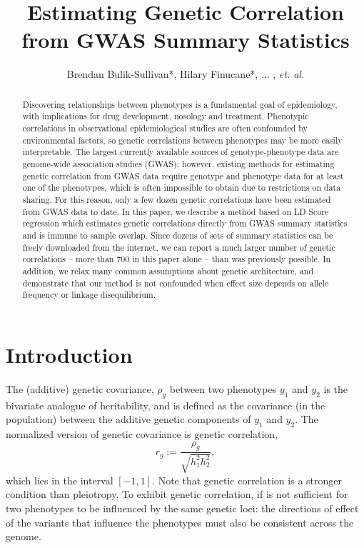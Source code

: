 \documentclass[11pt]{article}
\title{Estimating Genetic Correlation from GWAS Summary Statistics}
\author{Brendan Bulik-Sullivan*, Hilary Finucane*, ... , \emph{et. al.}}
\numberwithin{equation}{section}
\begin{document}
\maketitle
\newpage
\tableofcontents
\newpage


\begin{abstract}\label{abstract}

Discovering relationships between phenotypes is a fundamental goal of epidemiology,
with implications for drug development, nosology and treatment.
Phenotypic correlations in observational epidemiological studies are often confounded by environmental factors,
so genetic correlations between phenotypes may be more easily interpretable.
The largest currently available sources of genotype-phenotype data are genome-wide association studies (GWAS); 
however, existing methods for estimating genetic correlation from GWAS data require
genotype and phenotype data for at least one of the phenotypes, 
which is often impossible to obtain due to restrictions on data sharing.
For this reason, only a few dozen genetic correlations have been estimated from GWAS data to date.
In this paper, we describe a method based on LD Score regression
which estimates genetic correlations directly from GWAS summary statistics
and is immune to sample overlap. 
Since dozens of sets of summary statistics can be freely downloaded from the internet,
we can report a much larger number of  genetic correlations 
 -- more than 700 in this paper alone -- than was previously possible.
In addition, we relax many common assumptions about genetic architecture, 
and demonstrate that our method is not confounded  
when effect size depends on allele frequency or linkage disequilibrium.

\end{abstract}


\section{Introduction}
\label{Introduction}

The (additive) genetic covariance, $\rho_g$ between two phenotypes $y_1$ and $y_2$ is the bivariate analogue of heritability,
and is defined as the covariance (in the population) between the additive genetic components of $y_1$ and $y_2$. 
The normalized version of genetic covariance is genetic correlation,
\begin{equation}
	r_g := \dfrac{\rho_g}{\sqrt{h^2_1h^2_2}},
\end{equation}
which lies in the interval $[-1,1]$.
Note that genetic correlation is a stronger condition than pleiotropy. 
To exhibit genetic correlation,
if is not sufficient for two phenotypes to be influenced by the same genetic loci:
the directions of effect of the variants that influence the phenotypes must also be consistent across the genome.
\end{document}
